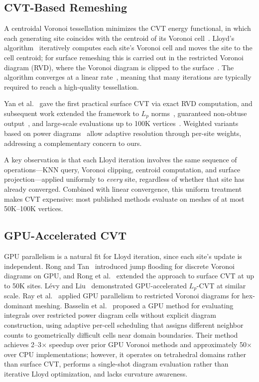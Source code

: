 \subsection{CVT-Based Remeshing}

A centroidal Voronoi tessellation minimizes the CVT energy functional, in which each generating site coincides with the centroid of its Voronoi cell~\cite{du1999cvt}. Lloyd's algorithm~\cite{lloyd1982} iteratively computes each site's Voronoi cell and moves the site to the cell centroid; for surface remeshing this is carried out in the restricted Voronoi diagram (RVD), where the Voronoi diagram is clipped to the surface~\cite{du2003surface}. The algorithm converges at a linear rate~\cite{du2006acceleration}, meaning that many iterations are typically required to reach a high-quality tessellation.

Yan et al.~\cite{yan2009rvd} gave the first practical surface CVT via exact RVD computation, and subsequent work extended the framework to $L_p$ norms~\cite{levy2010lp}, guaranteed non-obtuse output~\cite{yan2016nonobtuse}, and large-scale evaluations up to 100K vertices~\cite{yan2014clipped}. Weighted variants based on power diagrams~\cite{aurenhammer1987power, degoes2012blue, budninskiy2016power} allow adaptive resolution through per-site weights, addressing a complementary concern to ours.

A key observation is that each Lloyd iteration involves the same sequence of operations---KNN query, Voronoi clipping, centroid computation, and surface projection---applied uniformly to \emph{every} site, regardless of whether that site has already converged. Combined with linear convergence, this uniform treatment makes CVT expensive: most published methods evaluate on meshes of at most 50K--100K vertices.

\subsection{GPU-Accelerated CVT}

GPU parallelism is a natural fit for Lloyd iteration, since each site's update is independent. Rong and Tan~\cite{rong2006jump} introduced jump flooding for discrete Voronoi diagrams on GPU, and Rong et al.~\cite{rong2011gpu} extended the approach to surface CVT at up to 50K sites. L\'{e}vy and Liu~\cite{levy2010lp} demonstrated GPU-accelerated $L_p$-CVT at similar scale. Ray et al.~\cite{ray2018hex} applied GPU parallelism to restricted Voronoi diagrams for hex-dominant meshing. Basselin et al.~\cite{basselin2021restricted} proposed a GPU method for evaluating integrals over restricted power diagram cells without explicit diagram construction, using adaptive per-cell scheduling that assigns different neighbor counts to geometrically difficult cells near domain boundaries. Their method achieves 2--3$\times$ speedup over prior GPU Voronoi methods and approximately 50$\times$ over CPU implementations; however, it operates on tetrahedral domains rather than surface CVT, performs a single-shot diagram evaluation rather than iterative Lloyd optimization, and lacks curvature awareness.

